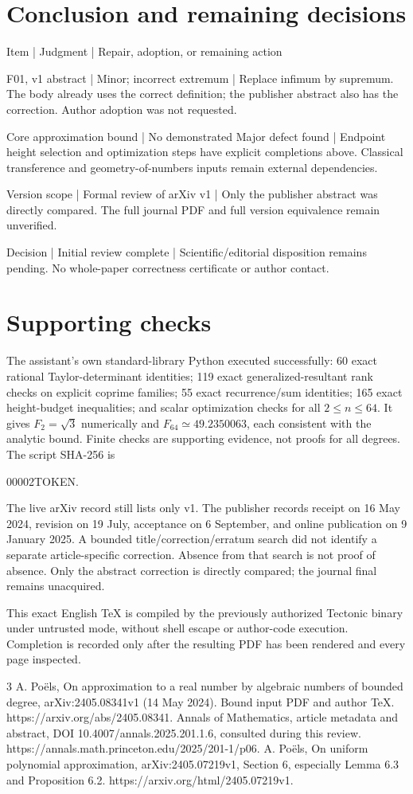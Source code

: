 \documentclass[10pt]{article}
\begin{document}
\section*{Conclusion and remaining decisions}
Item | Judgment | Repair, adoption, or remaining action\par
F01, v1 abstract | Minor; incorrect extremum | Replace infimum by supremum. The body already uses the correct definition; the publisher abstract also has the correction. Author adoption was not requested.\par
Core approximation bound | No demonstrated Major defect found | Endpoint height selection and optimization steps have explicit completions above. Classical transference and geometry-of-numbers inputs remain external dependencies.\par
Version scope | Formal review of arXiv v1 | Only the publisher abstract was directly compared. The full journal PDF and full version equivalence remain unverified.\par
Decision | Initial review complete | Scientific/editorial disposition remains pending. No whole-paper correctness certificate or author contact.\par
\section*{Supporting checks}
The assistant’s own standard-library Python executed successfully: 60 exact rational Taylor-determinant identities; 119 exact generalized-resultant rank checks on explicit coprime families; 55 exact recurrence/sum identities; 165 exact height-budget inequalities; and scalar optimization checks for all \(2\le n\le64\). It gives \(F_2=\sqrt3\) numerically and \(F_{64}\simeq49.2350063\), each consistent with the analytic bound. Finite checks are supporting evidence, not proofs for all degrees. The script SHA-256 is\par
00002TOKEN.\par
The live arXiv record still lists only v1. The publisher records receipt on 16 May 2024, revision on 19 July, acceptance on 6 September, and online publication on 9 January 2025. A bounded title/correction/erratum search did not identify a separate article-specific correction. Absence from that search is not proof of absence. Only the abstract correction is directly compared; the journal final remains unacquired.\par
This exact English TeX is compiled by the previously authorized Tectonic binary under untrusted mode, without shell escape or author-code execution. Completion is recorded only after the resulting PDF has been rendered and every page inspected.\par
3 A. Poëls, On approximation to a real number by algebraic numbers of bounded degree, arXiv:2405.08341v1 (14 May 2024). Bound input PDF and author TeX. https://arxiv.org/abs/2405.08341. Annals of Mathematics, article metadata and abstract, DOI 10.4007/annals.2025.201.1.6, consulted during this review. https://annals.math.princeton.edu/2025/201-1/p06. A. Poëls, On uniform polynomial approximation, arXiv:2405.07219v1, Section 6, especially Lemma 6.3 and Proposition 6.2. https://arxiv.org/html/2405.07219v1.\par
\end{document}
